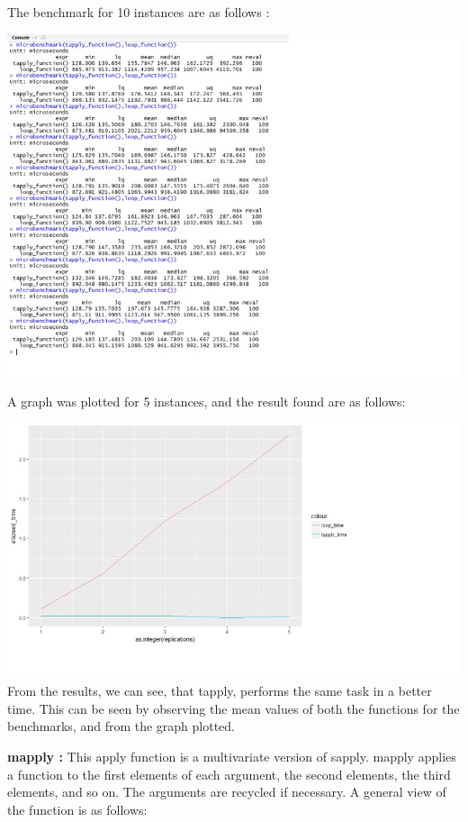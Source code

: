\documentclass{article}
\begin{document}
	The benchmark for 10 instances are as follows :
\begin{center}
	\includegraphics{benchmark_tapply.jpg}
\end{center}

\pagebreak
A graph was plotted for 5 instances, and the result found are as follows:

\includegraphics{plot_tapply.jpg}
From the results, we can see, that tapply, performs the same task in a better time. This can be seen by observing the mean values of both the functions for the benchmarks, and from the graph plotted.

\pagebreak

\textbf{mapply :}
This apply function is a multivariate version of sapply. mapply applies a function to the first elements of each argument, the second elements, the third elements, and so on. The arguments are recycled if necessary. A general view of the function is as follows: 
\end{document}
